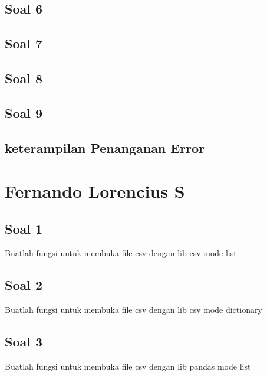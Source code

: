 \subsection{Soal 6}

\subsection{Soal 7}

\subsection{Soal 8}

\subsection{Soal 9}

\subsection{keterampilan Penanganan Error}


\section{Fernando Lorencius S}
\subsection{Soal 1}
Buatlah fungsi untuk membuka file csv dengan lib csv mode list


\subsection{Soal 2}
Buatlah fungsi untuk membuka file csv dengan lib csv mode dictionary


\subsection{Soal 3}
Buatlah fungsi untuk membuka file csv dengan lib pandas mode list


